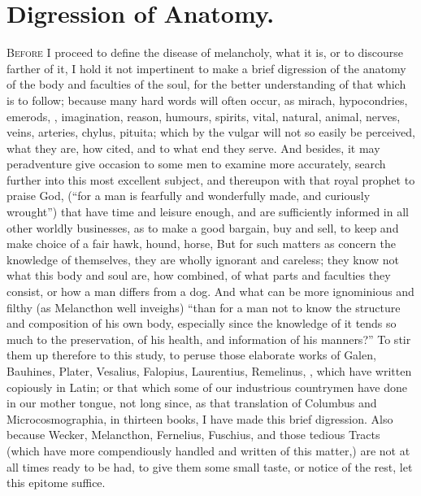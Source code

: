 \section{Digression of Anatomy.}

\lettrine{B}{efore} I proceed to define the disease of melancholy, what it is,
or to discourse farther of it, I hold it not impertinent to make a brief
digression of the anatomy of the body and faculties of the soul, for the better
understanding of that which is to follow; because many hard words will often
occur, as mirach, hypocondries, emerods, \etc{}, imagination, reason, humours,
spirits, vital, natural, animal, nerves, veins, arteries, chylus, pituita;
which by the vulgar will not so easily be perceived, what they are, how cited,
and to what end they serve. And besides, it may peradventure give occasion to
some men to examine more accurately, search further into this most excellent
subject, and thereupon with that royal prophet to praise
God, (\enquote{for a man is fearfully and wonderfully made, and curiously wrought})
that have time and leisure enough, and are sufficiently informed in all other
worldly businesses, as to make a good bargain, buy and sell, to keep and make
choice of a fair hawk, hound, horse, \etc{} But for such matters as concern the
knowledge of themselves, they are wholly ignorant and careless; they know not
what this body and soul are, how combined, of what parts and faculties they
consist, or how a man differs from a dog. And what can be more ignominious and
filthy (as Melancthon well inveighs) \enquote{than for a man not to
know the structure and composition of his own body, especially since the
knowledge of it tends so much to the preservation, of his health, and
information of his manners?} To stir them up therefore to this study, to peruse
those elaborate works of Galen, Bauhines, Plater, Vesalius,
Falopius, Laurentius, Remelinus, \etc{}, which have written copiously in Latin;
or that which some of our industrious countrymen have done in our mother
tongue, not long since, as that translation of Columbus and
Microcosmographia, in thirteen books, I have made this
brief digression. Also because Wecker,
Melancthon, Fernelius,
Fuschius, and those tedious Tracts  (which have more compendiously handled and written of this matter,) are
not at all times ready to be had, to give them some small taste, or notice of
the rest, let this epitome suffice.

